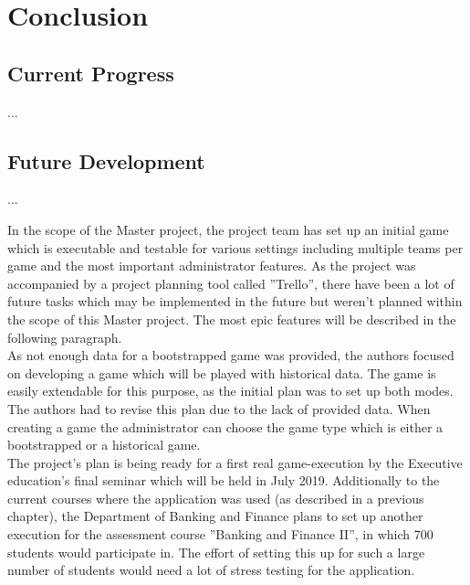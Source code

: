 \section{Conclusion}

\subsection{Current Progress}

...

\subsection{Future Development}

...

In the scope of the Master project, the project team has set up an initial game which is executable and testable for various settings including multiple teams per game and the most important administrator features. As the project was accompanied by a project planning tool called ''Trello'', there have been a lot of future tasks which may be implemented in the future but weren't planned within the scope of this Master project. The most epic features will be described in the following paragraph. \\

As not enough data for a bootstrapped game was provided, the authors focused on developing a game which will be played with historical data. The game is easily extendable for this purpose, as the initial plan was to set up both modes. The authors had to revise this plan due to the lack of provided data. When creating a game the administrator can choose the game type which is either a bootstrapped or a historical game. \\


The project's plan is being ready for a first real game-execution by the Executive education's final seminar which will be held in July 2019. Additionally to the current courses where the application was used (as described in a previous chapter), the Department of Banking and Finance plans to set up another execution for the assessment course ''Banking and Finance II'', in which 700 students would participate in. The effort of setting this up for such a large number of students would need a lot of stress testing for the application.
